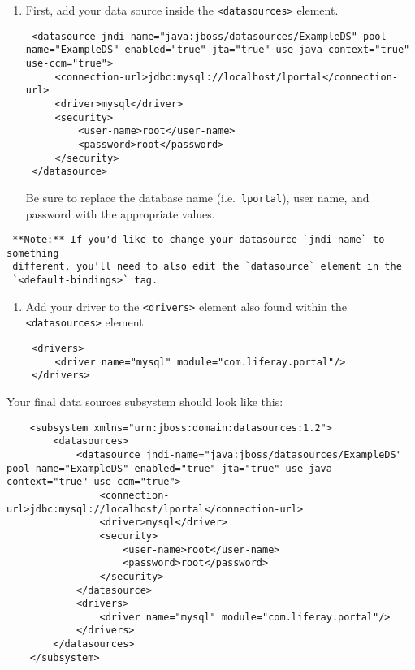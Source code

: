 \begin{enumerate}
\def\labelenumi{\arabic{enumi}.}
\item
  First, add your data source inside the
  \texttt{\textless{}datasources\textgreater{}} element.

\begin{verbatim}
 <datasource jndi-name="java:jboss/datasources/ExampleDS" pool-name="ExampleDS" enabled="true" jta="true" use-java-context="true" use-ccm="true">
     <connection-url>jdbc:mysql://localhost/lportal</connection-url>
     <driver>mysql</driver>
     <security>
         <user-name>root</user-name>
         <password>root</password>
     </security>
 </datasource>
\end{verbatim}

  Be sure to replace the database name (i.e.~\texttt{lportal}), user
  name, and password with the appropriate values.
\end{enumerate}

\noindent\hrulefill

\begin{verbatim}
 **Note:** If you'd like to change your datasource `jndi-name` to something
 different, you'll need to also edit the `datasource` element in the
 `<default-bindings>` tag.
\end{verbatim}

\noindent\hrulefill

\begin{enumerate}
\def\labelenumi{\arabic{enumi}.}
\setcounter{enumi}{1}
\item
  Add your driver to the \texttt{\textless{}drivers\textgreater{}}
  element also found within the
  \texttt{\textless{}datasources\textgreater{}} element.

\begin{verbatim}
 <drivers>
     <driver name="mysql" module="com.liferay.portal"/>
 </drivers>
\end{verbatim}
\end{enumerate}

Your final data sources subsystem should look like this:

\begin{verbatim}
    <subsystem xmlns="urn:jboss:domain:datasources:1.2">
        <datasources>
            <datasource jndi-name="java:jboss/datasources/ExampleDS" pool-name="ExampleDS" enabled="true" jta="true" use-java-context="true" use-ccm="true">
                <connection-url>jdbc:mysql://localhost/lportal</connection-url>
                <driver>mysql</driver>
                <security>
                    <user-name>root</user-name>
                    <password>root</password>
                </security>
            </datasource>
            <drivers>
                <driver name="mysql" module="com.liferay.portal"/>
            </drivers>
        </datasources>
    </subsystem>
\end{verbatim}

